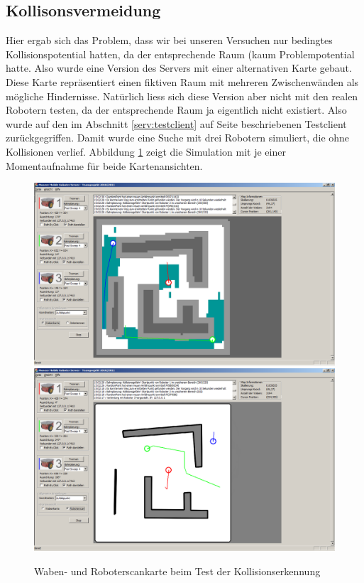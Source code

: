\subsection{Kollisonsvermeidung}
Hier ergab sich das Problem, dass wir bei unseren Versuchen nur
bedingtes Kollisionspotential hatten, da der entsprechende Raum (kaum
Problempotential hatte. Also wurde eine Version des Servers mit einer
alternativen Karte gebaut. Diese Karte repräsentiert einen fiktiven
Raum mit mehreren Zwischenwänden als mögliche Hindernisse. Natürlich
liess sich diese Version aber nicht mit den realen Robotern testen, da
der entsprechende Raum ja eigentlich nicht existiert. Also wurde auf
den im Abschnitt \ref{serv:testclient} auf Seite
\pageref{serv:testclient} beschriebenen Testclient
zurückgegriffen. Damit wurde eine Suche mit drei Robotern simuliert,
die ohne Kollisionen verlief. Abbildung \ref{fig:kollisonsvermeidung}
zeigt die Simulation mit je einer Momentaufnahme für beide Kartenansichten.
\begin{figure}[h!]
\includegraphics[width=0.5\linewidth]{bilder/avoidCollision2}
\includegraphics[width=0.5\linewidth]{bilder/avoidCollision1}
\caption{Waben- und Roboterscankarte beim Test der
  Kollisionserkennung}
\label{fig:kollisonsvermeidung}
\end{figure}

